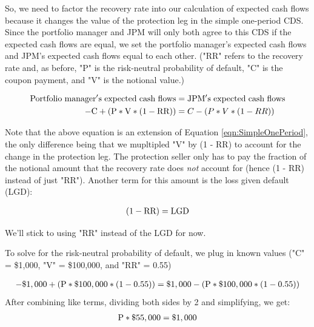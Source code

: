 \documentclass[article]{jss}
\begin{document}
So, we need to factor the recovery rate into our calculation of expected cash flows because it changes the value of the protection leg in the simple one-period CDS. Since the portfolio manager and JPM will only both agree to this CDS if the expected cash flows are equal, we set the portfolio manager's expected cash flows and JPM's expected cash flows equal to each other. ("RR" refers to the recovery rate and, as before, "P" is the risk-neutral probability of default, "C" is the coupon payment, and "V" is the notional value.)

\label{eqn:recovery}
\begin{align}
  \rm Portfolio\hspace{3pt}manager's\hspace{3pt}expected\hspace{3pt}cash\hspace{3pt}flows &= \rm JPM's\hspace{3pt}expected\hspace{3pt}cash\hspace{3pt}flows \\
  \rm - C + (P * V * (1 - RR)) &= C - (P * V * (1 - RR))
\end{align}

Note that the above equation is an extension of Equation \ref{eqn:SimpleOnePeriod}, the only difference being that we mupltipled "V" by (1 - RR) to account for the change in the protection leg. The protection seller only has to pay the fraction of the notional amount that the recovery rate does \emph{not} account for (hence (1 - RR) instead of just "RR"). Another term for this amount is the loss given default (LGD):

\begin{equation}
 \begin{aligned}
   {\rm (1 - RR) = LGD}
    \end{aligned}
\label{eqn:recovery}
\end{equation}

We'll stick to using "RR" instead of the LGD for now.

To solve for the risk-neutral probability of default, we plug in known values ("C" = \$1,000, "V" = \$100,000, and "RR" = 0.55)

\begin{equation}
 \begin{aligned}
   {\rm - \$1,000 + (P * \$100,000 * (1 - 0.55)) = \$1,000 - (P * \$100,000 * (1 - 0.55))}
    \end{aligned}
\end{equation}
After combining like terms, dividing both sides by 2 and simplifying, we get:
\begin{equation}
 \begin{aligned}
   {\rm P * \$55,000 = \$1,000}
    \end{aligned}
\end{equation}
\end{document}
